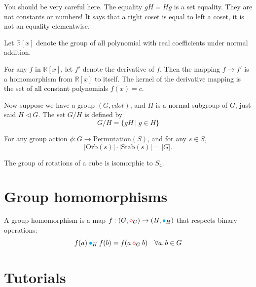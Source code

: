 You should be very careful here. The equality $gH = Hg$ is a set equality. They are not constants or numbers! It says that a 
right coset is equal to left a coset, it is not an equality elementwise.

\begin{example}
    Let $\mathbb{R}[x]$ denote the group of all polynomial with real coefficients under normal addition. 

    For any $f$ in $\mathbb{R}[x]$, let $f'$ denote the derivative of $f$. Then the mapping $f \to f'$ is a homomorphism from 
    $\mathbb{R}[x]$ to itself. The kernel of the derivative mapping is the set of all constant polynomials $f(x) = c$.
\end{example}

Now suppose we have a group $(G, cdot)$, and $H$ is a normal subgroup of $G$, just said $H \vartriangleleft G$. The set $G/H$ is defined by 
\[
G/H = \{ gH \> | \> g \in H \}
\]



\begin{theorem}
    For any group action $\phi : G \to \text{Permutation}(S)$, and for any $s \in S$,
    \begin{equation}
        |\text{Orb}(s)| \cdot |\text{Stab}(s)| = |G|.
    \end{equation}
\end{theorem}

\begin{theorem}
    The group of rotations of a cube is isomorphic to $S_4$.
\end{theorem}

\section{Group homomorphisms}

\begin{definition}
    A group homomorphism is a map $f: (G,{\color{red} \diamond}_G) \to (H, {\color{cyan} \bullet}_H)$ that respects binary operations:
    \begin{equation}
        f(a) \> {\color{cyan} \bullet}_H \> f(b) = f(a \> {\color{red} \diamond}_G \> b) \quad \forall a, b \in G
    \end{equation}
\end{definition}

\section{Tutorials}

